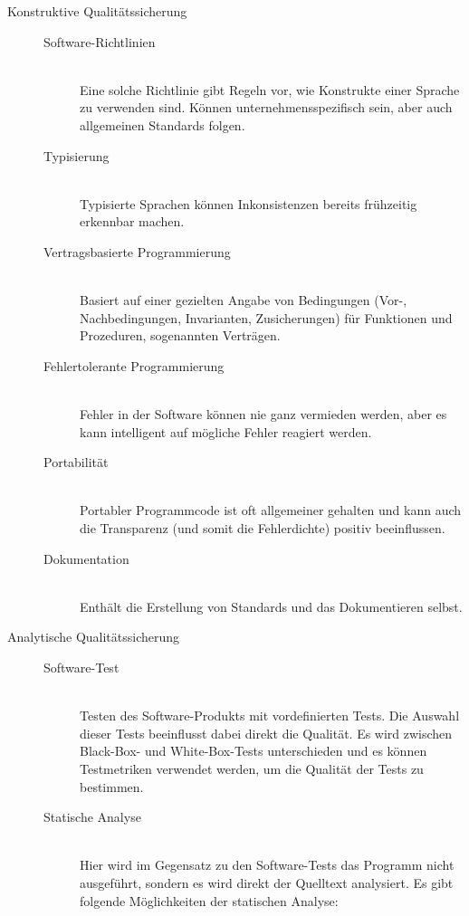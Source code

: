 \begin{description}
  \item[Konstruktive Qualitätssicherung] \hfill
  \begin{description}
    \item[Software-Richtlinien] \hfill \\ Eine solche Richtlinie gibt Regeln vor, wie Konstrukte einer Sprache zu verwenden sind. Können unternehmensspezifisch sein, aber auch allgemeinen Standards folgen.
    \item[Typisierung] \hfill \\ Typisierte Sprachen können Inkonsistenzen bereits frühzeitig erkennbar machen.
    \item[Vertragsbasierte Programmierung] \hfill \\ Basiert auf einer gezielten Angabe von Bedingungen (Vor-, Nachbedingungen, Invarianten, Zusicherungen) für Funktionen und Prozeduren, sogenannten Verträgen.
    \item[Fehlertolerante Programmierung] \hfill \\ Fehler in der Software können nie ganz vermieden werden, aber es kann intelligent auf mögliche Fehler reagiert werden.
    \item[Portabilität] \hfill \\ Portabler Programmcode ist oft allgemeiner gehalten und kann auch die Transparenz (und somit die Fehlerdichte) positiv beeinflussen.
    \item[Dokumentation] \hfill \\ Enthält die Erstellung von Standards und das Dokumentieren selbst.
  \end{description}
  \item[Analytische Qualitätssicherung] \hfill
  \begin{description}
    \item[Software-Test] \hfill \\ Testen des Software-Produkts mit vordefinierten Tests. Die Auswahl dieser Tests beeinflusst dabei direkt die Qualität. Es wird zwischen Black-Box- und White-Box-Tests unterschieden und es können Testmetriken verwendet werden, um die Qualität der Tests zu bestimmen.
    \item[Statische Analyse] \hfill \\ Hier wird im Gegensatz zu den Software-Tests das Programm nicht ausgeführt, sondern es wird direkt der Quelltext analysiert. Es gibt folgende Möglichkeiten der statischen Analyse:
    \begin{description}

\end{description}
\end{description}
\end{description}
